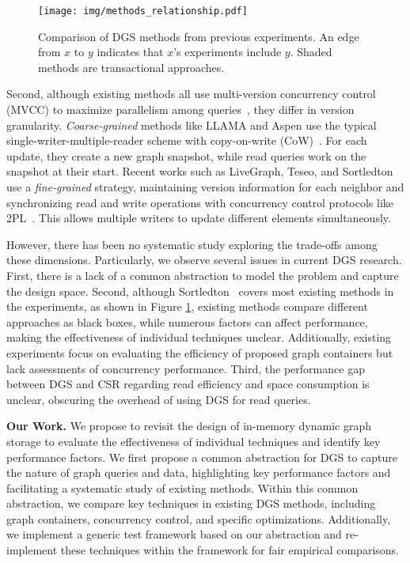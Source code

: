 \begin{figure}[t]\small
    \setlength{\abovecaptionskip}{3pt}
    \setlength{\belowcaptionskip}{0pt}
    \texttt{[image: img/methods\_relationship.pdf]}
    \centering
    \caption{Comparison of DGS methods from previous experiments. An edge from $x$ to $y$ indicates that $x$’s experiments include $y$. Shaded methods are transactional approaches.}
    \label{fig:method_relationship}
\end{figure}

Second, although existing methods all use multi-version concurrency control (MVCC) to maximize parallelism among queries~\cite{wu2017empirical}, they differ in version granularity. \emph{Coarse-grained} methods like LLAMA and Aspen use the typical single-writer-multiple-reader scheme with copy-on-write (CoW)~\cite{lmdb}. For each update, they create a new graph snapshot, while read queries work on the snapshot at their start. Recent works such as LiveGraph, Teseo, and Sortledton use a \emph{fine-grained} strategy, maintaining version information for each neighbor and synchronizing read and write operations with concurrency control protocols like 2PL~\cite{ramakrishnan2002database}. This allows multiple writers to update different elements simultaneously. 

However, there has been no systematic study exploring the trade-offs among these dimensions. Particularly, we observe several issues in current DGS research. First, there is a lack of a common abstraction to model the problem and capture the design space. Second, although Sortledton~\cite{fuchs2022sortledton} covers most existing methods in the experiments, as shown in Figure \ref{fig:method_relationship}, existing methods compare different approaches as black boxes, while numerous factors can affect performance, making the effectiveness of individual techniques unclear. Additionally, existing experiments focus on evaluating the efficiency of proposed graph containers but lack assessments of concurrency performance. Third, the performance gap between DGS and CSR regarding read efficiency and space consumption is unclear, obscuring the overhead of using DGS for read queries.

\vspace{2pt}
\noindent\textbf{Our Work.} We propose to revisit the design of in-memory dynamic graph storage to evaluate the effectiveness of individual techniques and identify key performance factors. We first propose a common abstraction for DGS to capture the nature of graph queries and data, highlighting key performance factors and facilitating a systematic study of existing methods. Within this common abstraction, we compare key techniques in existing DGS methods, including graph containers, concurrency control, and specific optimizations. Additionally, we implement a generic test framework based on our abstraction and re-implement these techniques within the framework for fair empirical comparisons.


